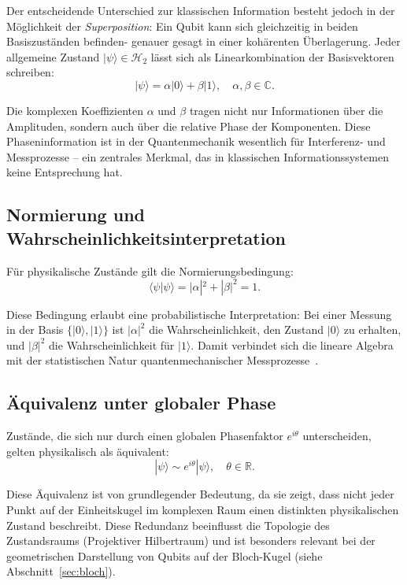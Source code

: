 Der entscheidende Unterschied zur klassischen Information besteht jedoch in der Möglichkeit der \emph{Superposition}: Ein Qubit kann sich gleichzeitig in beiden Basiszuständen befinden- genauer gesagt in einer kohärenten Überlagerung. Jeder allgemeine Zustand $|\psi\rangle \in \mathcal{H}_2$ lässt sich als Linearkombination der Basisvektoren schreiben:
\begin{equation}
|\psi\rangle = \alpha |0\rangle + \beta |1\rangle, \quad \alpha, \beta \in \mathbb{C}.
\end{equation}

Die komplexen Koeffizienten $\alpha$ und $\beta$ tragen nicht nur Informationen über die Amplituden, sondern auch über die relative Phase der Komponenten. Diese Phaseninformation ist in der Quantenmechanik wesentlich für Interferenz- und Messprozesse – ein zentrales Merkmal, das in klassischen Informationssystemen keine Entsprechung hat.

\subsection*{Normierung und Wahrscheinlichkeitsinterpretation}
Für physikalische Zustände gilt die Normierungsbedingung:
\begin{equation}
\langle \psi | \psi \rangle = |\alpha|^2 + |\beta|^2 = 1.
\end{equation}

Diese Bedingung erlaubt eine probabilistische Interpretation: Bei einer Messung in der Basis $\{ |0\rangle, |1\rangle \}$ ist $|\alpha|^2$ die Wahrscheinlichkeit, den Zustand $|0\rangle$ zu erhalten, und $|\beta|^2$ die Wahrscheinlichkeit für $|1\rangle$. Damit verbindet sich die lineare Algebra mit der statistischen Natur quantenmechanischer Messprozesse~\cite{fliessbachQM}.

\subsection*{Äquivalenz unter globaler Phase}
Zustände, die sich nur durch einen globalen Phasenfaktor $e^{i\theta}$ unterscheiden, gelten physikalisch als äquivalent:
\begin{equation}
|\psi\rangle \sim e^{i\theta}|\psi\rangle, \quad \theta \in \mathbb{R}.
\end{equation}

Diese Äquivalenz ist von grundlegender Bedeutung, da sie zeigt, dass nicht jeder Punkt auf der Einheitskugel im komplexen Raum einen distinkten physikalischen Zustand beschreibt. Diese Redundanz beeinflusst die Topologie des Zustandsraums (Projektiver Hilbertraum) und ist besonders relevant bei der geometrischen Darstellung von Qubits auf der Bloch-Kugel (siehe Abschnitt~\ref{sec:bloch}).

